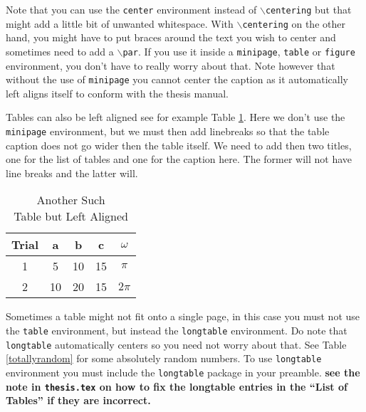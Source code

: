 Note that you can use the \texttt{center} environment instead of
\texttt{$\backslash$centering} but that might add a little bit of
unwanted whitespace.  With \texttt{$\backslash$centering} on the other
hand, you might have to put braces around the text you wish to center
and sometimes need to add a \texttt{$\backslash$par}.  If you use it
inside a \texttt{minipage}, \texttt{table} or \texttt{figure}
environment, you don't have to really worry about that.  Note however
that without the use of \texttt{minipage} you cannot center the
caption as it automatically left aligns itself to conform with the
thesis manual.

Tables can also be left aligned see for example Table \ref{ltab}.
Here we don't use the \texttt{minipage} environment, but we must then
add linebreaks so that the table caption does not go wider then the
table itself.  We need to add then two titles, one for the list of
tables and one for the caption here.  The former will not have line
breaks and the latter will.
% 
\begin{table}[hbt]
  \caption[
  Another Such Table but Left Aligned]{
    Another Such\\Table but Left Aligned\label{ltab}}
  \begin{tabular}{|c||c|c|c|c||}    \hline
    Trial &	a  &  b & c & $\omega$ \\ \hline \hline
    1 & 5 & 10  & 15 & $\pi$ \\ \hline
    2 & 10 & 20  & 15 & $2\pi$ \\ \hline
  \end{tabular}
\end{table}

Sometimes a table might not fit onto a single page, in this case you
must not use the \texttt{table} environment, but instead the
\texttt{longtable} environment.  Do note that \texttt{longtable}
automatically centers so you need not worry about that.  See Table
\ref{totallyrandom} for some absolutely random numbers.  To use
\texttt{longtable} environment you must include the \texttt{longtable}
package in your preamble. \textbf{see the note in \texttt{thesis.tex}
  on how to fix the longtable entries in the ``List of Tables'' if
  they are incorrect.}

